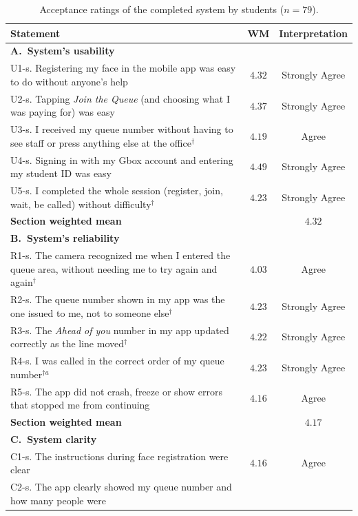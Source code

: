 \documentclass{research}
\begin{document}
\begin{table}[!htbp]
\centering
\caption{Acceptance ratings of the completed system by students
(\mbox{$n = 79$}).}
\label{tab:uat-ratings}
\begin{tabular}{p{}cc}
\hline
Statement & WM & Interpretation \\
\hline
\multicolumn{3}{l}{\textbf{A.\ System's usability}} \\
U1-s. Registering my face in the mobile app was easy to do without
  anyone's help & $4.32$ & Strongly Agree \\
U2-s. Tapping \emph{Join the Queue} (and choosing what I was paying
  for) was easy & $4.37$ & Strongly Agree \\
U3-s. I received my queue number without having to see staff or press
  anything else at the office$^{\dagger}$ & $4.19$ & Agree \\
U4-s. Signing in with my Gbox account and entering my student ID was
  easy & $4.49$ & Strongly Agree \\
U5-s. I completed the whole session (register, join, wait, be called)
  without difficulty$^{\dagger}$ & $4.23$ & Strongly Agree \\
\hline
\multicolumn{2}{l}{\textbf{Section weighted mean}} & $4.32$ \\
\hline
\multicolumn{3}{l}{\textbf{B.\ System's reliability}} \\
R1-s. The camera recognized me when I entered the queue area, without
  needing me to try again and again$^{\dagger}$ & $4.03$ & Agree \\
R2-s. The queue number shown in my app was the one issued to me, not to
  someone else$^{\dagger}$ & $4.23$ & Strongly Agree \\
R3-s. The \emph{Ahead of you} number in my app updated correctly as the
  line moved$^{\dagger}$ & $4.22$ & Strongly Agree \\
R4-s. I was called in the correct order of my queue
  number$^{\dagger a}$ & $4.23$ & Strongly Agree \\
R5-s. The app did not crash, freeze or show errors that stopped me from
  continuing & $4.16$ & Agree \\
\hline
\multicolumn{2}{l}{\textbf{Section weighted mean}} & $4.17$ \\
\hline
\multicolumn{3}{l}{\textbf{C.\ System clarity}} \\
C1-s. The instructions during face registration were clear
  & $4.16$ & Agree \\
C2-s. The app clearly showed my queue number and how many people were

\end{tabular}
\end{table}
\end{document}
